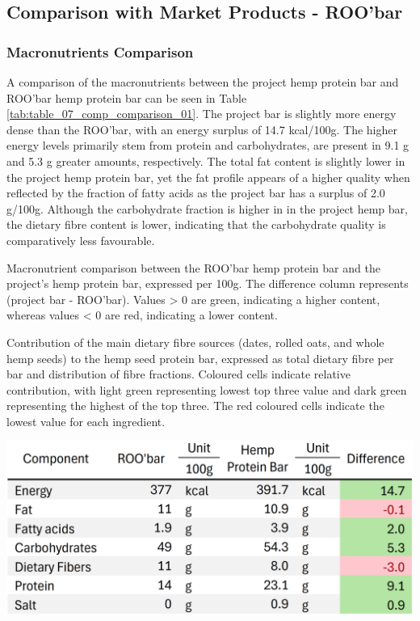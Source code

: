 \subsection{Comparison with Market Products - ROO'bar}
\subsubsection{Macronutrients Comparison}
A comparison of the macronutrients between the project hemp protein bar and ROO’bar hemp protein bar can be seen in Table \ref*{tab:table_07_comp_comparison_01}. The project bar is slightly more energy dense than the ROO’bar, with an energy surplus of 14.7 kcal/100g. The higher energy levels primarily stem from protein and carbohydrates, are present in 9.1 g and 5.3 g greater amounts, respectively. The total fat content is slightly lower in the project hemp protein bar, yet the fat profile appears of a higher quality when reflected by the fraction of fatty acids as the project bar has a surplus of 2.0 g/100g. Although the carbohydrate fraction is higher in in the project hemp bar, the dietary fibre content is lower, indicating that the carbohydrate quality is comparatively less favourable. 

\vspace{1em}
Macronutrient comparison between the ROO'bar hemp protein bar and the project's hemp protein bar, expressed per 100g. The difference column represents (project bar - ROO'bar). Values > 0 are green, indicating a higher content, whereas values < 0 are red, indicating a lower content.

\begin{table}[H]
    \centering
    \caption{Contribution of the main dietary fibre sources (dates, rolled oats, and whole hemp seeds) to the hemp seed protein bar,
    expressed as total dietary fibre per bar and distribution of fibre fractions. Coloured cells indicate relative contribution, with light
    green representing lowest top three value and dark green representing the highest of the top three. The red coloured cells indicate the
    lowest value for each ingredient.}
    \label{tab:table_07_comp_comparison_01}
    \includegraphics[width=\textwidth]{Figures/tab_comp_comparison_01.png}
\end{table}

